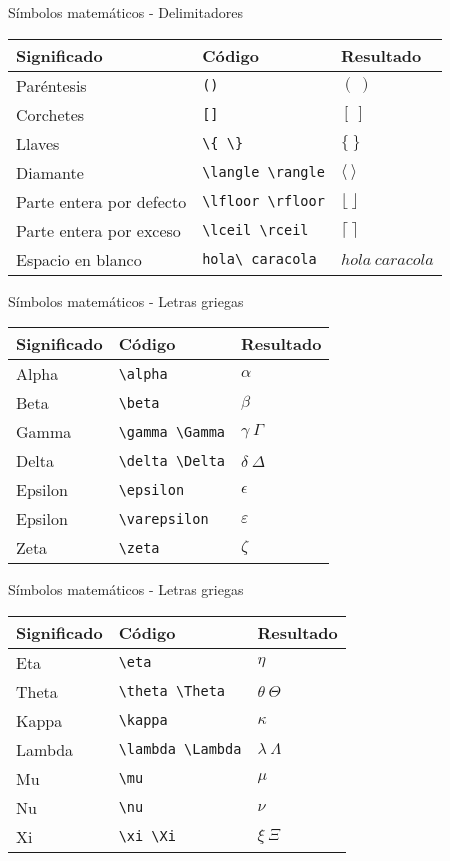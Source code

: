 \documentclass[
  ignorenonframetext,
]{beamer}
\begin{document}
\begin{frame}[fragile]{Símbolos matemáticos - Delimitadores}
\protect\hypertarget{suxedmbolos-matemuxe1ticos---delimitadores}{}

\begin{longtable}[]{@{}lll@{}}
\toprule
Significado & Código & Resultado\tabularnewline
\midrule
\endhead
Paréntesis & \texttt{()} & \((\ )\)\tabularnewline
Corchetes & \texttt{{[}{]}} & \([\ ]\)\tabularnewline
Llaves & \texttt{\textbackslash{}\{\ \textbackslash{}\}} &
\(\{\ \}\)\tabularnewline
Diamante & \texttt{\textbackslash{}langle\ \textbackslash{}rangle} &
\(\langle\ \rangle\)\tabularnewline
Parte entera por defecto &
\texttt{\textbackslash{}lfloor\ \textbackslash{}rfloor} &
\(\lfloor\  \rfloor\)\tabularnewline
Parte entera por exceso &
\texttt{\textbackslash{}lceil\ \textbackslash{}rceil} &
\(\lceil\ \rceil\)\tabularnewline
Espacio en blanco & \texttt{hola\textbackslash{}\ caracola} &
\(hola\ caracola\)\tabularnewline
\bottomrule
\end{longtable}

\end{frame}

\begin{frame}[fragile]{Símbolos matemáticos - Letras griegas}
\protect\hypertarget{suxedmbolos-matemuxe1ticos---letras-griegas}{}

\begin{longtable}[]{@{}lll@{}}
\toprule
Significado & Código & Resultado\tabularnewline
\midrule
\endhead
Alpha & \texttt{\textbackslash{}alpha} & \(\alpha\)\tabularnewline
Beta & \texttt{\textbackslash{}beta} & \(\beta\)\tabularnewline
Gamma & \texttt{\textbackslash{}gamma\ \textbackslash{}Gamma} &
\(\gamma\  \Gamma\)\tabularnewline
Delta & \texttt{\textbackslash{}delta\ \textbackslash{}Delta} &
\(\delta\  \Delta\)\tabularnewline
Epsilon & \texttt{\textbackslash{}epsilon} & \(\epsilon\)\tabularnewline
Epsilon & \texttt{\textbackslash{}varepsilon} &
\(\varepsilon\)\tabularnewline
Zeta & \texttt{\textbackslash{}zeta} & \(\zeta\)\tabularnewline
\bottomrule
\end{longtable}

\end{frame}

\begin{frame}[fragile]{Símbolos matemáticos - Letras griegas}
\protect\hypertarget{suxedmbolos-matemuxe1ticos---letras-griegas-1}{}

\begin{longtable}[]{@{}lll@{}}
\toprule
Significado & Código & Resultado\tabularnewline
\midrule
\endhead
Eta & \texttt{\textbackslash{}eta} & \(\eta\)\tabularnewline
Theta & \texttt{\textbackslash{}theta\ \textbackslash{}Theta} &
\(\theta\ \Theta\)\tabularnewline
Kappa & \texttt{\textbackslash{}kappa} & \(\kappa\)\tabularnewline
Lambda & \texttt{\textbackslash{}lambda\ \textbackslash{}Lambda} &
\(\lambda\  \Lambda\)\tabularnewline
Mu & \texttt{\textbackslash{}mu} & \(\mu\)\tabularnewline
Nu & \texttt{\textbackslash{}nu} & \(\nu\)\tabularnewline
Xi & \texttt{\textbackslash{}xi\ \textbackslash{}Xi} &
\(\xi\ \Xi\)\tabularnewline
\bottomrule
\end{longtable}

\end{frame}
\end{document}
